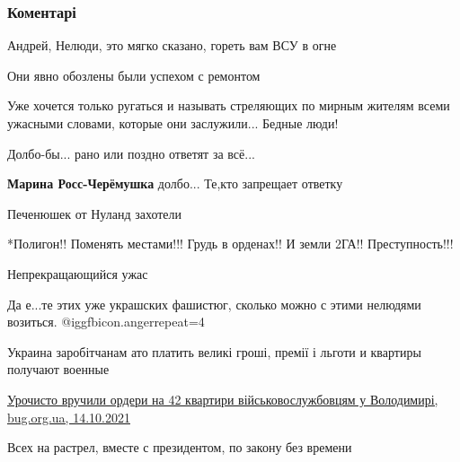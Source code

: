  
 
 
 
 
\subsubsection{Коментарі}
\label{sec:11_10_2021.fb.lysenko_andrej.dnr.volonter.1.kominternovo.cmt}

\begin{itemize} %
Андрей, Нелюди, это мягко сказано, гореть вам ВСУ в огне

Они явно обозлены были успехом с ремонтом

Уже хочется только ругаться и называть стреляющих по мирным жителям всеми ужасными словами, которые они заслужили... Бедные люди!

Долбо-бы... рано или поздно ответят за всё...

\textbf{Марина Росс-Черёмушка} долбо... Те,кто запрещает ответку

Печенюшек от Нуланд захотели

*Полигон!! Поменять местами!!! Грудь в орденах!! И земли 2ГА!! Преступность!!!

Непрекращающийся ужас

Да е...те этих уже украшских фашистюг, сколько можно с этими нелюдями возиться. @igg{fbicon.anger}{repeat=4} 


Украина заробітчанам ато платить великі гроші, премії і льготи и квартиры
получают военные

\href{http://bug.org.ua/news/volodymyr/urochysto-vruchyly-ordery-na-42-kvartyry-vijskovosluzhbovczyam-u-volodymyri-599262/}{%
Урочисто вручили ордери на 42 квартири військовослужбовцям у Володимирі, bug.org.ua, 14.10.2021%
}


Всех на растрел, вместе с президентом, по закону без времени


\end{itemize} %

